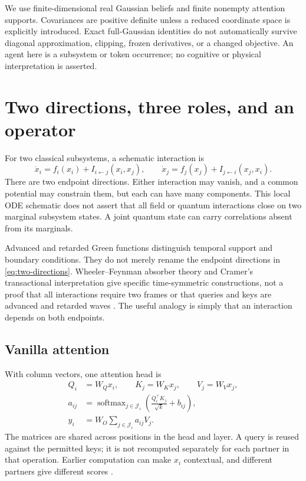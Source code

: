\documentclass[11pt,letterpaper]{article}
\newcommand{\softmax}{\operatorname{softmax}}
\theoremstyle{remark}
\begin{document}
We use finite-dimensional real Gaussian beliefs and finite nonempty attention supports. Covariances are positive definite unless a reduced coordinate space is explicitly introduced. Exact full-Gaussian identities do not automatically survive diagonal approximation, clipping, frozen derivatives, or a changed objective. An agent here is a subsystem or token occurrence; no cognitive or physical interpretation is asserted.

\section{Two directions, three roles, and an operator}
\label{sec:directions}
For two classical subsystems, a schematic interaction is
\begin{equation}
 \dot x_i=f_i(x_i)+I_{i\leftarrow j}(x_i,x_j),\qquad
 \dot x_j=f_j(x_j)+I_{j\leftarrow i}(x_j,x_i).
 \label{eq:two-directions}
\end{equation}
There are two endpoint directions. Either interaction may vanish, and a common potential may constrain them, but each can have many components. This local ODE schematic does not assert that all field or quantum interactions close on two marginal subsystem states. A joint quantum state can carry correlations absent from its marginals.

Advanced and retarded Green functions distinguish temporal support and boundary conditions. They do not merely rename the endpoint directions in \eqref{eq:two-directions}. Wheeler--Feynman absorber theory and Cramer's transactional interpretation give specific time-symmetric constructions, not a proof that all interactions require two frames or that queries and keys are advanced and retarded waves \cite{WheelerFeynman1945,Cramer1986}. The useful analogy is simply that an interaction depends on both endpoints.

\subsection{Vanilla attention}
With column vectors, one attention head is
\begin{align}
 Q_i&=W_Qx_i,\qquad K_j=W_Kx_j,\qquad V_j=W_Vx_j,\\
 a_{ij}&=\softmax_{j\in\mathcal J_i}
 \left(\frac{Q_i^\top K_j}{\sqrt{k}}+b_{ij}\right),\\
 y_i&=W_O\sum_{j\in\mathcal J_i}a_{ij}V_j.
 \label{eq:vanilla}
\end{align}
The matrices are shared across positions in the head and layer. A query is reused against the permitted keys; it is not recomputed separately for each partner in that operation. Earlier computation can make $x_i$ contextual, and different partners give different scores \cite{Vaswani2017}.
\end{document}
